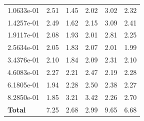 \begin{table}[htbp]
\begin{tabular}{lrrrrr}
    1.0633e-01 & 2.51 & 1.45 & 2.02 & 3.02 & 2.32 \\
    1.4257e-01 & 2.49 & 1.62 & 2.15 & 3.09 & 2.41 \\
    1.9117e-01 & 2.08 & 1.93 & 2.01 & 2.81 & 2.25 \\
    2.5634e-01 & 2.05 & 1.83 & 2.07 & 2.01 & 1.99 \\
    3.4376e-01 & 2.10 & 1.84 & 2.09 & 2.31 & 2.10 \\
    4.6083e-01 & 2.27 & 2.21 & 2.47 & 2.19 & 2.28 \\
    6.1805e-01 & 1.94 & 2.28 & 2.50 & 2.38 & 2.27 \\
    8.2850e-01 & 1.85 & 3.21 & 3.42 & 2.26 & 2.70 \\
    \midrule
    \textbf{Total} & 7.25 & 2.68 & 2.99 & 9.65 & 6.68 \\
    \bottomrule
  \end{tabular}
\end{table}
